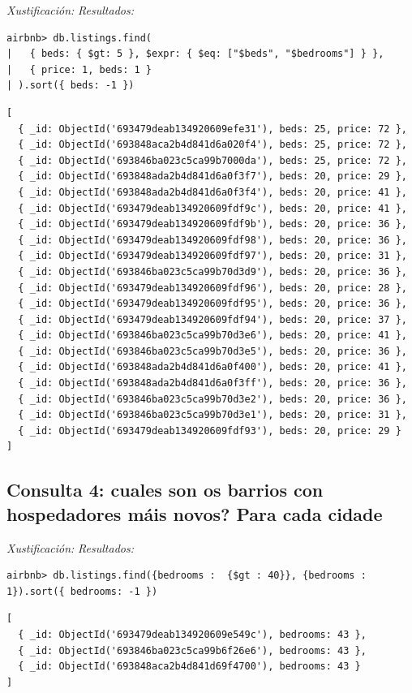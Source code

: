 \documentclass[12pt,a4paper]{article}
\begin{document}
\emph{Xustificación:}
\emph{Resultados:} 
\begin{lstlisting}
airbnb> db.listings.find(
|   { beds: { $gt: 5 }, $expr: { $eq: ["$beds", "$bedrooms"] } },
|   { price: 1, beds: 1 }
| ).sort({ beds: -1 })
\end{lstlisting}
\begin{lstlisting}[style=terminal]
[
  { _id: ObjectId('693479deab134920609efe31'), beds: 25, price: 72 },
  { _id: ObjectId('693848aca2b4d841d6a020f4'), beds: 25, price: 72 },
  { _id: ObjectId('693846ba023c5ca99b7000da'), beds: 25, price: 72 },
  { _id: ObjectId('693848ada2b4d841d6a0f3f7'), beds: 20, price: 29 },
  { _id: ObjectId('693848ada2b4d841d6a0f3f4'), beds: 20, price: 41 },
  { _id: ObjectId('693479deab134920609fdf9c'), beds: 20, price: 41 },
  { _id: ObjectId('693479deab134920609fdf9b'), beds: 20, price: 36 },
  { _id: ObjectId('693479deab134920609fdf98'), beds: 20, price: 36 },
  { _id: ObjectId('693479deab134920609fdf97'), beds: 20, price: 31 },
  { _id: ObjectId('693846ba023c5ca99b70d3d9'), beds: 20, price: 36 },
  { _id: ObjectId('693479deab134920609fdf96'), beds: 20, price: 28 },
  { _id: ObjectId('693479deab134920609fdf95'), beds: 20, price: 36 },
  { _id: ObjectId('693479deab134920609fdf94'), beds: 20, price: 37 },
  { _id: ObjectId('693846ba023c5ca99b70d3e6'), beds: 20, price: 41 },
  { _id: ObjectId('693846ba023c5ca99b70d3e5'), beds: 20, price: 36 },
  { _id: ObjectId('693848ada2b4d841d6a0f400'), beds: 20, price: 41 },
  { _id: ObjectId('693848ada2b4d841d6a0f3ff'), beds: 20, price: 36 },
  { _id: ObjectId('693846ba023c5ca99b70d3e2'), beds: 20, price: 36 },
  { _id: ObjectId('693846ba023c5ca99b70d3e1'), beds: 20, price: 31 },
  { _id: ObjectId('693479deab134920609fdf93'), beds: 20, price: 29 }
]
\end{lstlisting}



\subsection*{Consulta 4: cuales son os barrios con hospedadores máis novos? Para cada cidade} 
\emph{Xustificación:}
\emph{Resultados:} 
\begin{lstlisting}
airbnb> db.listings.find({bedrooms :  {$gt : 40}}, {bedrooms : 1}).sort({ bedrooms: -1 })
\end{lstlisting}
\begin{lstlisting}[style=terminal]
[
  { _id: ObjectId('693479deab134920609e549c'), bedrooms: 43 },
  { _id: ObjectId('693846ba023c5ca99b6f26e6'), bedrooms: 43 },
  { _id: ObjectId('693848aca2b4d841d69f4700'), bedrooms: 43 }
]

\end{lstlisting}
\end{document}
